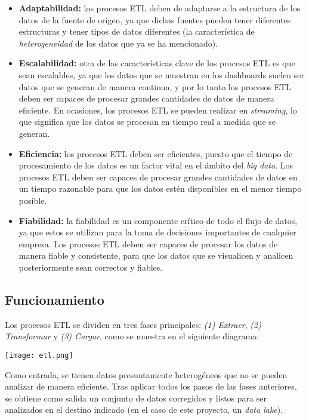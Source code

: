 \begin{itemize}
	\item \textbf{Adaptabilidad:} los procesos ETL deben de adaptarse a la
		estructura de los datos de la fuente de origen, ya que dichas fuentes
		pueden tener diferentes estructuras y tener tipos de datos diferentes
		(la característica de \textit{heterogeneidad} de los datos que ya se ha
		mencionado).
	\item \textbf{Escalabilidad:} otra de las características clave de los
		procesos ETL es que sean escalables, ya que los datos que se muestran en
		los dashboards suelen ser datos que se generan de manera continua, y por
		lo tanto los procesos ETL deben ser capaces de procesar grandes
		cantidades de datos de manera eficiente. En ocasiones, los procesos ETL
		se pueden realizar en \textit{streaming}, lo que significa que los datos
		se procesan en tiempo real a medida que se generan.
	\item \textbf{Eficiencia:} los procesos ETL deben ser eficientes, puesto que
		el tiempo de procesamiento de los datos es un factor vital en el ámbito
		del \textit{big data}. Los procesos ETL deben ser capaces de procesar
		grandes cantidades de datos en un tiempo razonable para que los datos
		estén disponibles en el menor tiempo posible.
	\item \textbf{Fiabilidad:} la fiabilidad es un componente crítico de todo el
		flujo de datos, ya que estos se utilizan para la toma de decisiones
		importantes de cualquier empresa. Los procesos ETL deben ser capaces de
		procesar los datos de manera fiable y consistente, para que los datos
		que se visualicen y analicen posteriormente sean correctos y fiables.
\end{itemize}


\subsection{Funcionamiento}
Los procesos ETL se dividen en tres fases principales: \textit{(1) Extraer},
\textit{(2) Transformar} y \textit{(3) Cargar}, como se muestra en el siguiente
diagrama:

\begin{minipage}{\linewidth}
	\centering
	\texttt{[image: etl.png]}
\end{minipage}

Como entrada, se tienen datos presuntamente heterogéneos que no se pueden
analizar de manera eficiente. Tras aplicar todos los pasos de las fases
anteriores, se obtiene como salida un conjunto de datos corregidos y listos para
ser analizados en el destino indicado (en el caso de este proyecto, un
\emph{data lake}).

